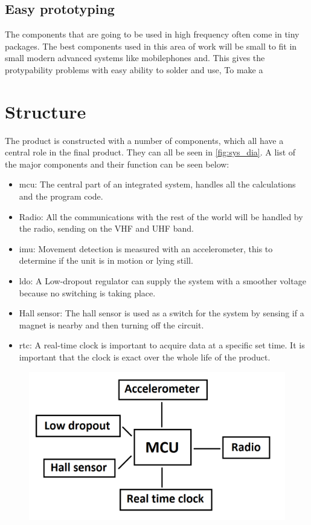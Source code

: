 \subsection{Easy prototyping}
The components that are going to be used in high frequency often come in tiny packages. The best components used in this area of work will be small to fit in small modern advanced systems like mobilephones and.  This gives the protypability problems with easy ability to solder and use, To make a

\section{Structure}
The product is constructed with a number of components, which all have a central role in the final product. They can all be seen in \autoref{fig:sys_dia}. A list of the major components and their function can be seen below:

\begin{itemize}[noitemsep] 
\item \gls{mcu}: The central part of an integrated system, handles all the calculations and the program code.
\item Radio: All the communications with the rest of the world will be handled by the radio, sending on the VHF and UHF band.
\item \gls{imu}: Movement detection is measured with an accelerometer, this to determine if the unit is in motion or lying still. 
\item \gls{ldo}: A Low-dropout regulator can supply the system with a smoother voltage because no switching is taking place.
\item Hall sensor: The hall sensor is used as a switch for the system by sensing if a magnet is nearby and then turning off the circuit.
\item \gls{rtc}: A real-time clock is important to acquire data at a specific set time. It is important that the clock is exact over the whole life of the product.
\end{itemize} 


\begin{figure}[H] 
	\centering 
	\includegraphics[width=.8\linewidth]{Figures/System_diagram} 
	\label{fig:sys_dia} 
\end{figure} 

